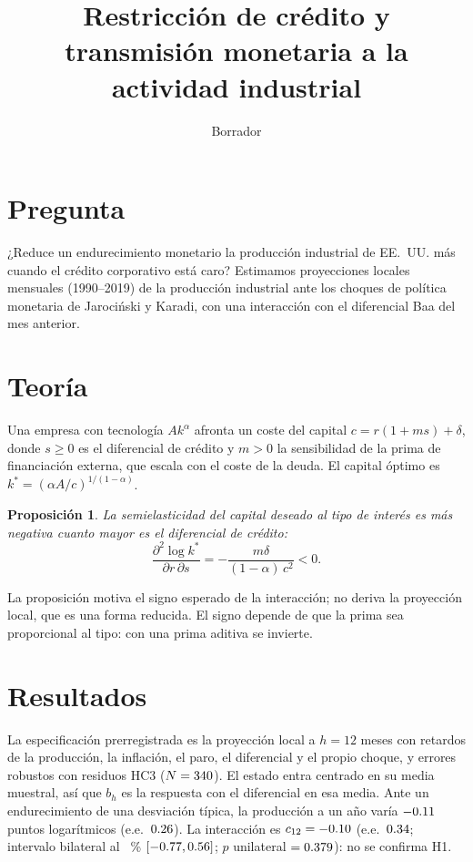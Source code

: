 \documentclass[11pt]{article}
\title{Restricción de crédito y transmisión monetaria a la actividad industrial}
\date{Borrador}
\newtheorem{proposition}{Proposición}
\begin{document}
\maketitle

\section{Pregunta}
¿Reduce un endurecimiento monetario la producción industrial de EE.~UU. más cuando el crédito corporativo está caro?
Estimamos proyecciones locales mensuales (1990--2019) de la producción industrial ante los choques de política monetaria
de Jarociński y Karadi, con una interacción con el diferencial Baa del mes anterior.

\section{Teoría}
Una empresa con tecnología $A k^\alpha$ afronta un coste del capital $c = r(1 + m s) + \delta$, donde $s \geq 0$ es el
diferencial de crédito y $m > 0$ la sensibilidad de la prima de financiación externa, que escala con el coste de la
deuda. El capital óptimo es $k^* = (\alpha A / c)^{1/(1-\alpha)}$.

\begin{proposition}
La semielasticidad del capital deseado al tipo de interés es más negativa cuanto mayor es el diferencial de crédito:
\[
  \frac{\partial^2 \log k^*}{\partial r \, \partial s} = -\frac{m \delta}{(1-\alpha)\, c^2} < 0 .
\]
\end{proposition}

La proposición motiva el signo esperado de la interacción; no deriva la proyección local, que es una forma reducida.
El signo depende de que la prima sea proporcional al tipo: con una prima aditiva se invierte.

\section{Resultados}
La especificación prerregistrada es la proyección local a $h = 12$ meses con \lags{} retardos de la producción, la
inflación, el paro, el diferencial y el propio choque, y errores robustos con residuos HC3 ($N = 340$). El
estado entra centrado en su media muestral, así que $b_h$ es la respuesta con el diferencial en esa media. Ante un
endurecimiento de una desviación típica, la producción a un año varía $-0.11$ puntos logarítmicos
(e.e.~$0.26$). La interacción es $c_{12} = -0.10$ (e.e.~$0.34$; intervalo bilateral al
\ciLevel{}~\% $[-0.77, 0.56]$; $p$ unilateral $= 0.379$): no se confirma H1.
\end{document}
